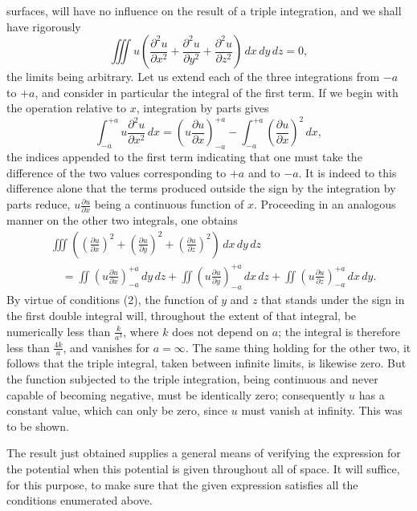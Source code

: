 \documentclass[11pt]{article}
\begin{document}
surfaces, will have no influence on the result of a triple integration, and we shall have rigorously
\[
\iiint u\left(\frac{\partial^2 u}{\partial x^2}+\frac{\partial^2 u}{\partial y^2}+\frac{\partial^2 u}{\partial z^2}\right)\,dx\,dy\,dz=0,
\]
the limits being arbitrary. Let us extend each of the three integrations from $-a$ to $+a$, and consider in particular the integral of the first term. If we begin with the operation relative to $x$, integration by parts gives
\[
\int_{-a}^{+a}u\frac{\partial^2u}{\partial x^2}\,dx=
\left(u\frac{\partial u}{\partial x}\right)_{-a}^{+a}-
\int_{-a}^{+a}\left(\frac{\partial u}{\partial x}\right)^2\,dx,
\]
the indices appended to the first term indicating that one must take the difference of the two values corresponding to $+a$ and to $-a$. It is indeed to this difference alone that the terms produced outside the sign by the integration by parts reduce, $u\frac{\partial u}{\partial x}$ being a continuous function of $x$. Proceeding in an analogous manner on the other two integrals, one obtains
\begin{align*}
&\iiint\left(\left(\frac{\partial u}{\partial x}\right)^2+\left(\frac{\partial u}{\partial y}\right)^2+\left(\frac{\partial u}{\partial z}\right)^2\right)\,dx\,dy\,dz \\
&\quad=\iint\left(u\frac{\partial u}{\partial x}\right)_{-a}^{+a}\,dy\,dz
+\iint\left(u\frac{\partial u}{\partial y}\right)_{-a}^{+a}\,dx\,dz
+\iint\left(u\frac{\partial u}{\partial z}\right)_{-a}^{+a}\,dx\,dy.
\end{align*}
By virtue of conditions (2), the function of $y$ and $z$ that stands under the sign in the first double integral will, throughout the extent of that integral, be numerically less than $\frac{k}{a^3}$, where $k$ does not depend on $a$; the integral is therefore less than $\frac{4k}{a}$, and vanishes for $a=\infty$. The same thing holding for the other two, it follows that the triple integral, taken between infinite limits, is likewise zero. But the function subjected to the triple integration, being continuous and never capable of becoming negative, must be identically zero; consequently $u$ has a constant value, which can only be zero, since $u$ must vanish at infinity. This was to be shown.

The result just obtained supplies a general means of verifying the expression for the potential when this potential is given throughout all of space. It will suffice, for this purpose, to make sure that the given expression satisfies all the conditions enumerated above.
\end{document}
